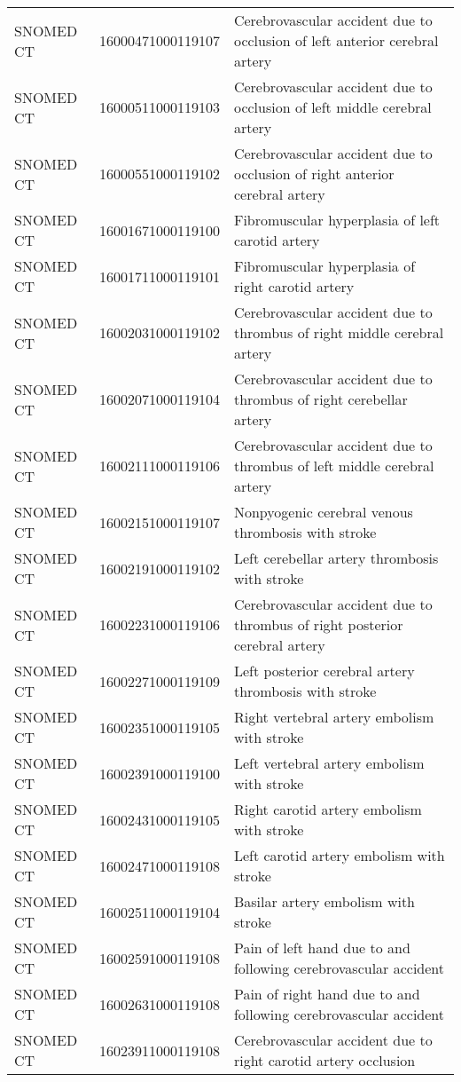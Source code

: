 \begin{longtable}{p{}p{}p{}}
  SNOMED CT & 16000471000119107 & Cerebrovascular accident due to occlusion of left anterior cerebral artery \\ 
  SNOMED CT & 16000511000119103 & Cerebrovascular accident due to occlusion of left middle cerebral artery \\ 
  SNOMED CT & 16000551000119102 & Cerebrovascular accident due to occlusion of right anterior cerebral artery \\ 
  SNOMED CT & 16001671000119100 & Fibromuscular hyperplasia of left carotid artery \\ 
  SNOMED CT & 16001711000119101 & Fibromuscular hyperplasia of right carotid artery \\ 
  SNOMED CT & 16002031000119102 & Cerebrovascular accident due to thrombus of right middle cerebral artery \\ 
  SNOMED CT & 16002071000119104 & Cerebrovascular accident due to thrombus of right cerebellar artery \\ 
  SNOMED CT & 16002111000119106 & Cerebrovascular accident due to thrombus of left middle cerebral artery \\ 
  SNOMED CT & 16002151000119107 & Nonpyogenic cerebral venous thrombosis with stroke \\ 
  SNOMED CT & 16002191000119102 & Left cerebellar artery thrombosis with stroke \\ 
  SNOMED CT & 16002231000119106 & Cerebrovascular accident due to thrombus of right posterior cerebral artery \\ 
  SNOMED CT & 16002271000119109 & Left posterior cerebral artery thrombosis with stroke \\ 
  SNOMED CT & 16002351000119105 & Right vertebral artery embolism with stroke \\ 
  SNOMED CT & 16002391000119100 & Left vertebral artery embolism with stroke \\ 
  SNOMED CT & 16002431000119105 & Right carotid artery embolism with stroke \\ 
  SNOMED CT & 16002471000119108 & Left carotid artery embolism with stroke \\ 
  SNOMED CT & 16002511000119104 & Basilar artery embolism with stroke \\ 
  SNOMED CT & 16002591000119108 & Pain of left hand due to and following cerebrovascular accident \\ 
  SNOMED CT & 16002631000119108 & Pain of right hand due to and following cerebrovascular accident \\ 
  SNOMED CT & 16023911000119108 & Cerebrovascular accident due to right carotid artery occlusion \\ 

\end{longtable}
